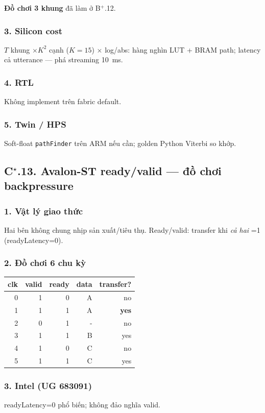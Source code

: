 \noindent\textbf{Đồ chơi 3 khung} đã làm ở B$^+$.12.

\subsubsection*{3. Silicon cost} $T$ khung $\times K^2$ cạnh ($K=15$) $\times$ log/abs: hàng nghìn LUT + BRAM path; latency cả utterance --- phá streaming 10~ms.
\subsubsection*{4. RTL} Không implement trên fabric default.
\subsubsection*{5. Twin / HPS} Soft-float \texttt{pathFinder} trên ARM nếu cần; golden Python Viterbi so khớp.

\subsection*{C$^\star$.13. Avalon-ST ready/valid --- đồ chơi backpressure}

\subsubsection*{1. Vật lý giao thức} Hai bên không chung nhịp sản xuất/tiêu thụ. Ready/valid: transfer khi \emph{cả hai} =1 (readyLatency=0).

\subsubsection*{2. Đồ chơi 6 chu kỳ}
\begin{center}\small
\begin{tabular}{@{}rrrrr@{}}
\toprule
clk & valid & ready & data & transfer? \\
\midrule
0 & 1 & 0 & A & no \\
1 & 1 & 1 & A & \textbf{yes} \\
2 & 0 & 1 & - & no \\
3 & 1 & 1 & B & yes \\
4 & 1 & 0 & C & no \\
5 & 1 & 1 & C & yes \\
\bottomrule
\end{tabular}
\end{center}

\subsubsection*{3. Intel (UG 683091)} readyLatency=0 phổ biến; không đảo nghĩa valid.

